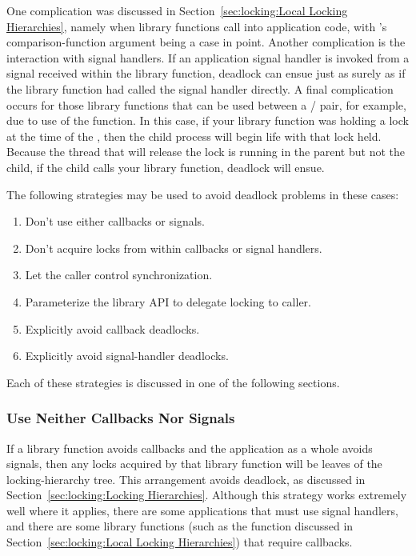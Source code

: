 One complication was discussed in
Section~\ref{sec:locking:Local Locking Hierarchies}, namely
when library functions call into application code, with 's
comparison-function argument being a case in point.
Another complication is the interaction with signal handlers.
If an application signal handler is invoked from a signal received within
the library function, deadlock can ensue just as surely as
if the library function had called the signal handler directly.
A final complication occurs for those library functions that can be used
between a / pair, for example, due to use of
the  function.
In this case, if your library function was holding a lock at the time of
the , then the child process will begin life with that lock held.
Because the thread that will release the lock is running in the parent
but not the child, if the child calls your library function, deadlock
will ensue.

The following strategies may be used to avoid deadlock problems in these cases:

\begin{enumerate}
\item	Don't use either callbacks or signals.
\item	Don't acquire locks from within callbacks or signal handlers.
\item	Let the caller control synchronization.
\item	Parameterize the library API to delegate locking to caller.
\item	Explicitly avoid callback deadlocks.
\item	Explicitly avoid signal-handler deadlocks.
\end{enumerate}

Each of these strategies is discussed in one of the following sections.

\subsubsection{Use Neither Callbacks Nor Signals}
\label{sec:locking:Use Neither Callbacks Nor Signals}

If a library function avoids callbacks and the application as a whole
avoids signals, then any locks acquired by that library function will
be leaves of the locking-hierarchy tree.
This arrangement avoids deadlock, as discussed in
Section~\ref{sec:locking:Locking Hierarchies}.
Although this strategy works extremely well where it applies,
there are some applications that must use signal handlers,
and there are some library functions (such as the  function
discussed in
Section~\ref{sec:locking:Local Locking Hierarchies})
that require callbacks.

